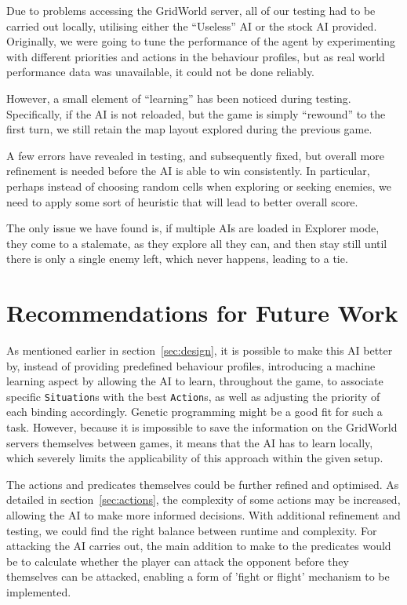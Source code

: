 \documentclass[11pt]{article}
\begin{document}
Due to problems accessing the GridWorld server, all of our testing had to be carried out locally, utilising either the ``Useless'' AI or the stock AI provided. Originally, we were going to tune the performance of the agent by experimenting with different priorities and actions in the behaviour profiles, but as real world performance data was unavailable, it could not be done reliably.

However, a small element of ``learning'' has been noticed during testing. Specifically, if the AI is not reloaded, but the game is simply ``rewound'' to the first turn, we still retain the map layout explored during the previous game.

A few errors have revealed in testing, and subsequently fixed, but overall more refinement is needed before the AI is able to win consistently. In particular, perhaps instead of choosing random cells when exploring or seeking enemies, we need to apply some sort of heuristic that will lead to better overall score.

The only issue we have found is, if multiple AIs are loaded in Explorer mode, they come to a stalemate, as they explore all they can, and then stay still until there is only a single enemy left, which never happens, leading to a tie.

\section{Recommendations for Future Work} \label{sec:futureWork}

As mentioned earlier in section~\ref{sec:design}, it is possible to make this AI better by, instead of providing predefined behaviour profiles, introducing a machine learning aspect by allowing the AI to learn, throughout the game, to associate specific \verb|Situation|s with the best \verb|Action|s, as well as adjusting the priority of each binding accordingly. Genetic programming might be a good fit for such a task. However, because it is impossible to save the information on the GridWorld servers themselves between games, it means that the AI has to learn locally, which severely limits the applicability of this approach within the given setup.

The actions and predicates themselves could be further refined and optimised. As detailed in section~\ref{sec:actions}, the complexity of some actions may be increased, allowing the AI to make more informed decisions. With additional refinement and testing, we could find the right balance between runtime and complexity.  For  attacking the AI carries out, the main addition to make to the predicates would be to calculate whether the player can attack the opponent before they themselves can be attacked, enabling a form of 'fight or flight' mechanism to be implemented.
\end{document}
